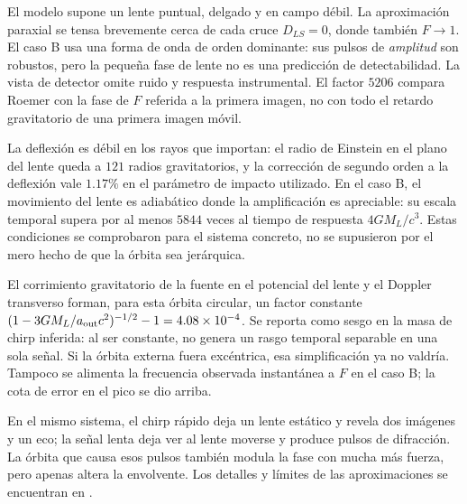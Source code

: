 \documentclass[11pt]{article}
\begin{document}
El modelo supone un lente puntual, delgado y en campo débil. La
aproximación paraxial se tensa brevemente cerca de cada cruce
$D_{LS}=0$, donde también $F\to1$. El caso B usa una forma de onda de
orden dominante: sus pulsos de \emph{amplitud} son robustos, pero la
pequeña fase de lente no es una predicción de detectabilidad. La vista
de detector omite ruido y respuesta instrumental. El factor $5206$
compara Roemer con la fase de $F$ referida a la primera imagen, no con
todo el retardo gravitatorio de una primera imagen móvil.

La deflexión es débil en los rayos que importan: el radio de Einstein
en el plano del lente queda a $121$ radios gravitatorios, y la
corrección de segundo orden a la deflexión vale $1.17\%$ en el
parámetro de impacto utilizado. En el caso B, el movimiento del lente
es adiabático donde la amplificación es apreciable: su escala temporal
supera por al menos $5844$ veces al tiempo de respuesta $4GM_L/c^3$.
Estas condiciones se comprobaron para el sistema concreto, no se
supusieron por el mero hecho de que la órbita sea jerárquica.

El corrimiento gravitatorio de la fuente en el potencial del lente y
el Doppler transverso forman, para esta órbita circular, un factor
constante $(1-3GM_L/a_{\rm out}c^2)^{-1/2}-1=4.08\times10^{-4}$.
Se reporta como sesgo en la masa de chirp inferida: al ser constante,
no genera un rasgo temporal separable en una sola señal. Si la órbita
externa fuera excéntrica, esa simplificación ya no valdría. Tampoco
se alimenta la frecuencia observada instantánea a $F$ en el caso B;
la cota de error en el pico se dio arriba.

En el mismo sistema, el chirp rápido deja un lente estático y revela
dos imágenes y un eco; la señal lenta deja ver al lente moverse y
produce pulsos de difracción. La órbita que causa esos pulsos también
modula la fase con mucha más fuerza, pero apenas altera la envolvente.
Los detalles y límites de las aproximaciones se encuentran en
\citep{Teoria}.

\renewcommand{\refname}{Referencias}


\end{document}
